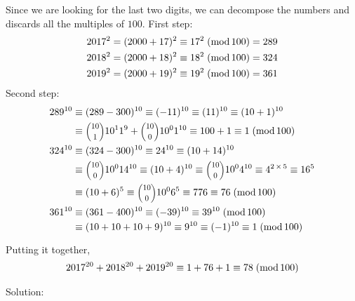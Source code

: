 Since we are looking for the last two digits, we can decompose the numbers and discards all the multiples of $100$. 
First step: 
\begin{align*}
2017^{2}
& = (2000+17)^{2}
\equiv 17^{2} \;(\mathrm{mod}\,100) 
= 289
\\
2018^{2}
& = (2000+18)^{2}
\equiv 18^{2} \;(\mathrm{mod}\,100) 
= 324
\\
2019^{2}
& = (2000+19)^{2}
\equiv 19^{2} \;(\mathrm{mod}\,100) 
= 361
\end{align*}
Second step:
\begin{align*}
289^{10}
& \equiv (289-300)^{10}
  \equiv (-11)^{10}
  \equiv (11)^{10} 
  \equiv (10+1)^{10}
\\
& \equiv \binomial{10}{1} 10^{1} 1^{9} + \binomial{10}{0} 10^{0} 1^{10}
  \equiv 100 + 1
  \equiv 1
\modulo{100}
\\
324^{10}
& \equiv (324-300)^{10}
  \equiv 24^{10}
  \equiv (10+14)^{10}
\\
& \equiv \binomial{10}{0} 10^{0} 14^{10}
  \equiv (10+4)^{10}
  \equiv \binomial{10}{0} 10^{0} 4^{10}
  \equiv 4^{2 \mult 5}
  \equiv 16^{5}
\\
& \equiv (10+6)^{5}
  \equiv \binomial{10}{0} 10^{0} 6^{5}
  \equiv 776
  \equiv 76
\modulo{100} 
\\
361^{10}
& \equiv (361-400)^{10}
  \equiv (-39)^{10} 
  \equiv 39^{10} \modulo{100}
\\
& \equiv (10+10+10+9)^{10}
  \equiv 9^{10}
  \equiv (-1)^{10}
  \equiv 1 \modulo{100}
\end{align*}

Putting it together,
\begin{align*}
2017^{20} + 2018^{20} + 2019^{20}
  \equiv 1 + 76 + 1
  \equiv 78 \;(\mathrm{mod}\,100)
\end{align*}

Solution: 